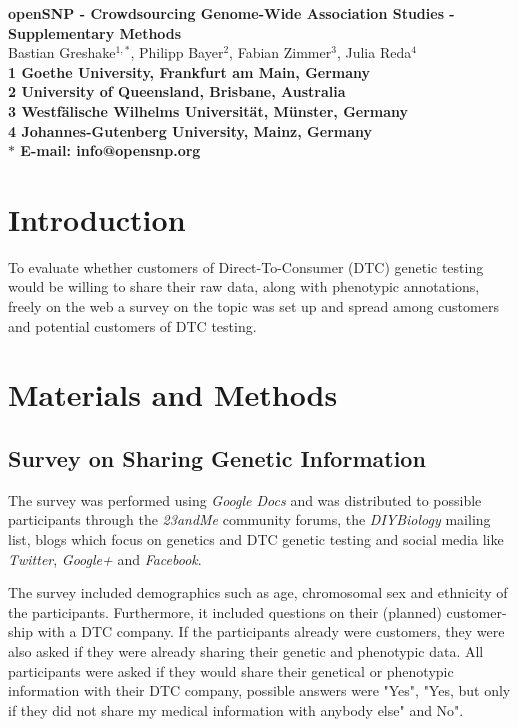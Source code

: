 \documentclass[10pt]{article}
\date{}
\begin{document}
\begin{flushleft}
{\Large
\textbf{openSNP - Crowdsourcing Genome-Wide Association Studies - Supplementary Methods}
}
% 
\\
Bastian Greshake$^{1,\ast}$, 
Philipp Bayer$^{2}$, 
Fabian Zimmer$^{3}$,
Julia Reda$^{4}$
\\
\bf{1} Goethe University, Frankfurt am Main, Germany
\\
\bf{2} University of Queensland, Brisbane, Australia
\\
\bf{3} Westf\"alische Wilhelms Universit\"at, M\"unster, Germany
\\
\bf{4} Johannes-Gutenberg University, Mainz, Germany
\\
$\ast$ E-mail: info@opensnp.org
\end{flushleft}

\section*{Introduction}
To evaluate whether customers of Direct-To-Consumer (DTC) genetic testing would be willing to share their raw data, along with phenotypic annotations, freely on the web a survey on the topic was set up and spread among customers and potential customers of DTC testing. 

\section*{Materials and Methods}
\subsection*{Survey on Sharing Genetic Information}
The survey was performed using \textit{Google Docs} and was distributed to possible participants through the \textit{23andMe }community forums, the \textit{DIYBiology} mailing list, 
blogs which focus on genetics and DTC genetic testing and social media like \textit{Twitter}, \textit{Google+} and \textit{Facebook}.  

The survey included demographics such as age, chromosomal sex and ethnicity of the participants. Furthermore, it included questions on their 
(planned) customer-ship with a DTC company. If the participants already were customers, they were also asked if they were already sharing their genetic and phenotypic data. 
All participants were asked if they would share their genetical or phenotypic information with their DTC company, possible answers were "Yes", "Yes, 
but only if they did not share my medical information with anybody else" and No".
\end{document}
